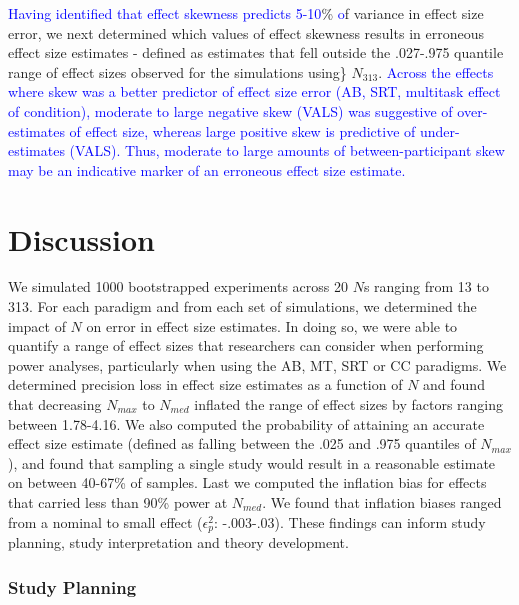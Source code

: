 \documentclass[
  man]{apa6}
\begin{document}
\textcolor{blue}{Having identified that effect skewness predicts 5-10}\% \textcolor{blue} of variance in effect size error, we next determined which values of effect skewness results in erroneous effect size estimates - defined as estimates that fell outside the .027-.975 quantile range of effect sizes observed for the simulations using\} \(N_{313}\). \textcolor{blue}{Across the effects where skew was a better predictor of effect size error (AB, SRT, multitask effect of condition), moderate to large negative skew (VALS) was suggestive of over-estimates of effect size, whereas large positive skew is predictive of under-estimates (VALS). Thus, moderate to large amounts of between-participant skew may be an indicative marker of an erroneous effect size estimate.}

\hypertarget{discussion}{%
\section{Discussion}\label{discussion}}

\label{sec:Discussion}

We simulated 1000 bootstrapped experiments across 20 \(N\)s ranging from 13 to 313. For each paradigm and from each set of simulations, we determined the impact of \(N\) on error in effect size estimates. In doing so, we were able to quantify a range of effect sizes that researchers can consider when performing power analyses, particularly when using the AB, MT, SRT or CC paradigms. We determined precision loss in effect size estimates as a function of \(N\) and found that decreasing \(N_{max}\) to \(N_{med}\) inflated the range of effect sizes by factors ranging between 1.78-4.16. We also computed the probability of attaining an accurate effect size estimate (defined as falling between the .025 and .975 quantiles of \(N_{max}\)), and found that sampling a single study would result in a reasonable estimate on between 40-67\% of samples. Last we computed the inflation bias for effects that carried less than 90\% power at \(N_{med}\). We found that inflation biases ranged from a nominal to small effect (\(\epsilon_{p}^2\): -.003-.03). These findings can inform study planning, study interpretation and theory development.

\hypertarget{study-planning}{%
\subsubsection{Study Planning}\label{study-planning}}
\end{document}
